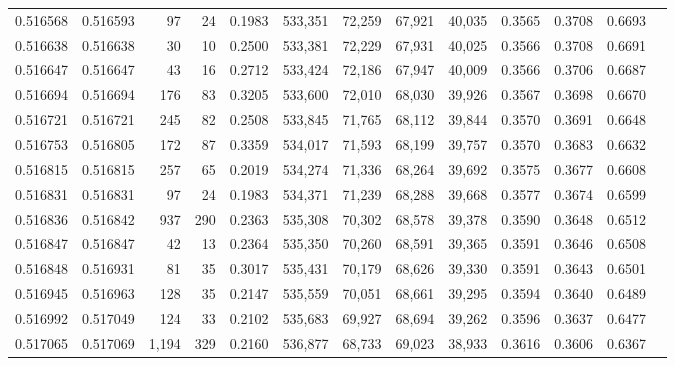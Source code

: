 \begin{tabular}{rrrrrrrrrrrrr}
0.516568 & 0.516593 &    97 &    24 &                                     0.1983 & 533,351 &  72,259 &  67,921 &  40,035 & 0.3565 & 0.3708 & 0.6693 \\
0.516638 & 0.516638 &    30 &    10 &                                     0.2500 & 533,381 &  72,229 &  67,931 &  40,025 & 0.3566 & 0.3708 & 0.6691 \\
0.516647 & 0.516647 &    43 &    16 &                                     0.2712 & 533,424 &  72,186 &  67,947 &  40,009 & 0.3566 & 0.3706 & 0.6687 \\
0.516694 & 0.516694 &   176 &    83 &                                     0.3205 & 533,600 &  72,010 &  68,030 &  39,926 & 0.3567 & 0.3698 & 0.6670 \\
0.516721 & 0.516721 &   245 &    82 &                                     0.2508 & 533,845 &  71,765 &  68,112 &  39,844 & 0.3570 & 0.3691 & 0.6648 \\
0.516753 & 0.516805 &   172 &    87 &                                     0.3359 & 534,017 &  71,593 &  68,199 &  39,757 & 0.3570 & 0.3683 & 0.6632 \\
0.516815 & 0.516815 &   257 &    65 &                                     0.2019 & 534,274 &  71,336 &  68,264 &  39,692 & 0.3575 & 0.3677 & 0.6608 \\
0.516831 & 0.516831 &    97 &    24 &                                     0.1983 & 534,371 &  71,239 &  68,288 &  39,668 & 0.3577 & 0.3674 & 0.6599 \\
0.516836 & 0.516842 &   937 &   290 &                                     0.2363 & 535,308 &  70,302 &  68,578 &  39,378 & 0.3590 & 0.3648 & 0.6512 \\
0.516847 & 0.516847 &    42 &    13 &                                     0.2364 & 535,350 &  70,260 &  68,591 &  39,365 & 0.3591 & 0.3646 & 0.6508 \\
0.516848 & 0.516931 &    81 &    35 &                                     0.3017 & 535,431 &  70,179 &  68,626 &  39,330 & 0.3591 & 0.3643 & 0.6501 \\
0.516945 & 0.516963 &   128 &    35 &                                     0.2147 & 535,559 &  70,051 &  68,661 &  39,295 & 0.3594 & 0.3640 & 0.6489 \\
0.516992 & 0.517049 &   124 &    33 &                                     0.2102 & 535,683 &  69,927 &  68,694 &  39,262 & 0.3596 & 0.3637 & 0.6477 \\
0.517065 & 0.517069 & 1,194 &   329 &                                     0.2160 & 536,877 &  68,733 &  69,023 &  38,933 & 0.3616 & 0.3606 & 0.6367 \\

\end{tabular}
